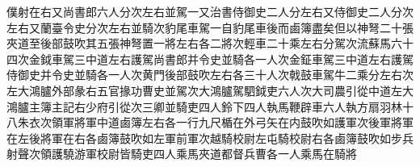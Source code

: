 僕射在右又尚書郎六人分次左右並駕一又治書侍御史二人分左右又侍御史二人分次左右又蘭臺令史分次左右並騎次豹尾車駕一自豹尾車後而鹵簿盡矣但以神弩二十張夾道至後部鼓吹其五張神弩置一將左右各二將次輕車二十乘左右分駕次流蘇馬六十四次金鉞車駕三中道左右護駕尚書郎并令史並騎各一人次金鉦車駕三中道左右護駕侍御史并令史並騎各一人次黄門後部鼓吹左右各三十人次戟鼓車駕牛二乘分左右次左大鴻臚外部彖右五官掾功曹史並駕次大鴻臚駕駟鉞吏六人次大司農引從中道左大鴻臚主簿主記右少府引從次三卿並騎吏四人鈴下四人執馬鞭辟車六人執方扇羽林十八朱衣次領軍將軍中道鹵簿左右各一行九尺楯在外弓矢在内鼓吹如護軍次後軍將軍在左後將軍在右各鹵簿鼓吹如左軍前軍次越騎校尉左屯騎校尉右各鹵簿鼓吹如步兵射聲次領護驍游軍校尉皆騎吏四人乘馬夾道都督兵曹各一人乘馬在騎將